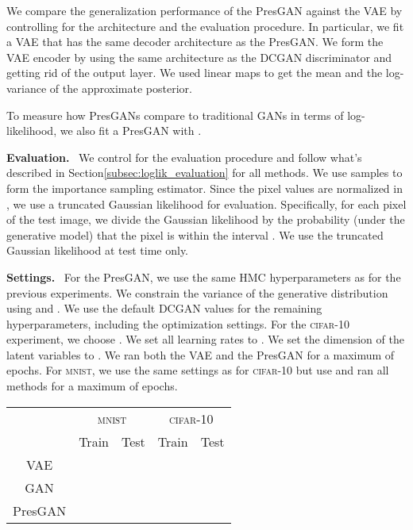 \documentclass[11pt]{article}
\DeclareRobustCommand{\parhead}[1]{\textbf{#1}~}
\begin{document}
We compare the generalization performance of the Pres\gls{GAN} against the \gls{VAE} \citep{kingma2013auto, rezende2014stochastic} by controlling for the architecture and the evaluation procedure. In particular, we fit a \gls{VAE} that has the same decoder architecture as the Pres\gls{GAN}. We form the \gls{VAE} encoder by using the same architecture as the \gls{DCGAN} discriminator and getting rid of the output layer. We used linear maps to get the mean and the log-variance of the approximate posterior. 

To measure how Pres\glspl{GAN} compare to traditional \glspl{GAN} in terms of log-likelihood, we also fit a Pres\gls{GAN} with . 

\parhead{Evaluation.}
We control for the evaluation procedure and follow what's described in Section\nobreakspace \ref {subsec:loglik_evaluation} for all methods. We use  samples to form the importance sampling estimator. Since the pixel values are normalized in , we use a truncated Gaussian likelihood for evaluation. Specifically, for each pixel of the test image, we divide the Gaussian likelihood by the probability (under the generative model) that the pixel is within the interval . We use the truncated Gaussian likelihood at test time only.

\parhead{Settings.}
For the Pres\gls{GAN}, we use the same \gls{HMC} hyperparameters as for the previous experiments. We constrain the variance of the generative distribution using  and . We use the default \gls{DCGAN} values for the remaining hyperparameters, including the optimization settings. For the \textsc{cifar}-10 experiment, we choose . We set all learning rates to . We set the dimension of the latent variables to . We ran both the \gls{VAE} and the Pres\gls{GAN} for a maximum of  epochs. For \textsc{mnist}, we use the same settings as for \textsc{cifar}-10 but use  and ran all methods for a maximum of  epochs. 


\begin{table}[t]
	\centering
	\small
	\begin{tabular}{ccccc}
		\toprule
		& \multicolumn{2}{c}{\textsc{mnist}} & \multicolumn{2}{c}{\textsc{cifar}-10} \\
		& Train & Test & Train & Test \\ \midrule
		\gls{VAE}     &  &  &  &    \\
		\gls{GAN} &  &  &  &   \\
		Pres\gls{GAN} &  &  &  &   \\
		\bottomrule
	\end{tabular}
	\label{tab:loglik}
\end{table}
\end{document}
